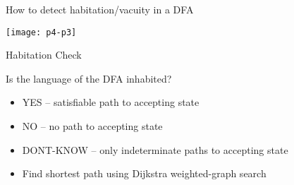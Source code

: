 
{  %
\begin{frame}{ How to detect habitation/vacuity in a DFA}

  \centering
  \texttt{[image: p4-p3]}
\end{frame}
}



\begin{frame}{Habitation Check}

  Is the language of the DFA inhabited?
  \begin{itemize}
  \item<1->{YES -- satisfiable path to accepting state}
  \item<2->{NO -- no path to accepting state}
  \item<3->{DONT-KNOW -- only indeterminate paths to accepting state}
  \item<4>{Find shortest path using Dijkstra weighted-graph search}
  \end{itemize}

\end{frame}
